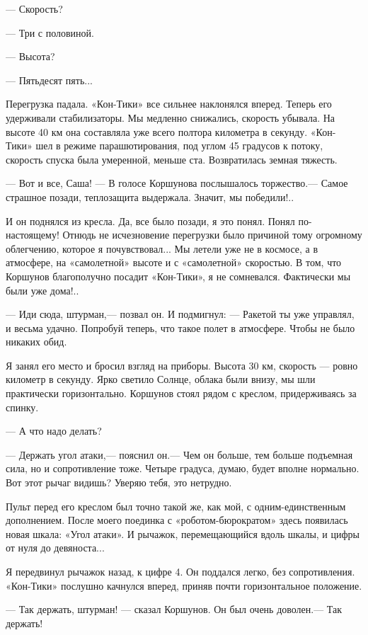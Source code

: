 \documentclass[11pt,a4paper,oneside]{article}
\begin{document}
— Скорость?

— Три с половиной.

— Высота?

— Пятьдесят пять...

Перегрузка падала. «Кон-Тики» все сильнее наклонялся вперед. Теперь его удерживали стабилизаторы. Мы медленно снижались, скорость убывала. На высоте 40 км она составляла уже всего полтора километра в секунду. «Кон-Тики» шел в режиме парашютирования, под углом 45 градусов к потоку, скорость спуска была умеренной, меньше ста. Возвратилась земная тяжесть.

— Вот и все, Саша! — В голосе Коршунова послышалось торжество.— Самое страшное позади, теплозащита выдержала. Значит, мы победили!..

И он поднялся из кресла. Да, все было позади, я это понял. Понял по- настоящему! Отнюдь не исчезновение перегрузки было причиной тому огромному облегчению, которое я почувствовал... Мы летели уже не в космосе, а в атмосфере, на «самолетной» высоте и с «самолетной» скоростью. В том, что Коршунов благополучно посадит «Кон-Тики», я не сомневался. Фактически мы были уже дома!..

— Иди сюда, штурман,— позвал он. И подмигнул: — Ракетой ты уже управлял, и весьма удачно. Попробуй теперь, что такое полет в атмосфере. Чтобы не было никаких обид.

Я занял его место и бросил взгляд на приборы. Высота 30 км, скорость — ровно километр в секунду. Ярко светило Солнце, облака были внизу, мы шли практически горизонтально. Коршунов стоял рядом с креслом, придерживаясь за спинку.

— А что надо делать?

— Держать угол атаки,— пояснил он.— Чем он больше, тем больше подъемная сила, но и сопротивление тоже. Четыре градуса, думаю, будет вполне нормально. Вот этот рычаг видишь? Уверяю тебя, это нетрудно.

Пульт перед его креслом был точно такой же, как мой, с одним-единственным дополнением. После моего поединка с «роботом-бюрократом» здесь появилась новая шкала: «Угол атаки». И рычажок, перемещающийся вдоль шкалы, и цифры от нуля до девяноста...

Я передвинул рычажок назад, к цифре 4. Он поддался легко, без сопротивления. «Кон-Тики» послушно качнулся вперед, приняв почти горизонтальное положение.

— Так держать, штурман! — сказал Коршунов. Он был очень доволен.— Так держать!
\end{document}
